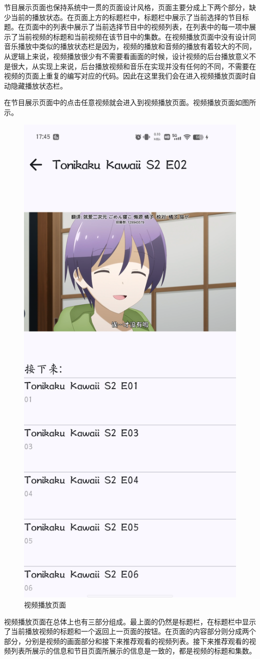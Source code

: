 \documentclass[main.tex]{subfiles}
\begin{document}
节目展示页面也保持系统中一贯的页面设计风格，页面主要分成上下两个部分，缺少当前的播放状态。在页面上方的标题栏中，标题栏中展示了当前选择的节目标题。在页面中的列表中展示了当前选择节目中的视频列表，在列表中的每一项中展示了当前视频的标题和当前视频在该节目中的集数。在视频播放页面中没有设计同音乐播放中类似的播放状态栏是因为，视频的播放和音频的播放有着较大的不同，从逻辑上来说，视频播放很少有不需要看画面的时候，设计视频的后台播放意义不是很大，从实现上来说，后台播放视频和音乐在实现并没有任何的不同，不需要在视频的页面上重复的编写对应的代码。因此在这里我们会在进入视频播放页面时自动隐藏播放状态栏。

在节目展示页面中的点击任意视频就会进入到视频播放页面。视频播放页面如图所示。

\begin{figure}[htbp]
    \centering
    \includegraphics[width=0.4\linewidth]{assets/video-page.png}
    \caption{视频播放页面}
    \label{fig:video-page}
\end{figure}

视频播放页面在总体上也有三部分组成。最上面的仍然是标题栏，在标题栏中显示了当前播放视频的标题和一个返回上一页面的按钮。在页面的内容部分则分成两个部分，分别是视频的画面部分和接下来推荐观看的视频列表。接下来推荐观看的视频列表所展示的信息和节目页面所展示的信息是一致的，都是视频的标题和集数。
\end{document}
